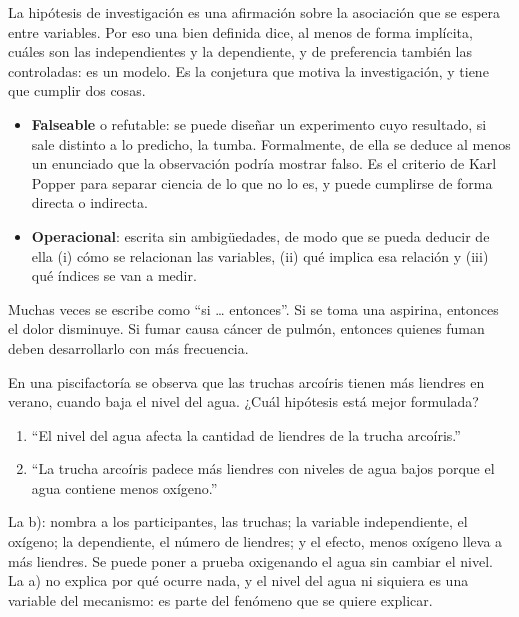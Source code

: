 \documentclass[11pt,letterpaper]{article}
\begin{document}
La hipótesis de investigación es una afirmación sobre la asociación
que se espera entre variables. Por eso una bien definida dice, al menos
de forma implícita, cuáles son las independientes y la dependiente, y
de preferencia también las controladas: es un modelo. Es la conjetura
que motiva la investigación, y tiene que cumplir dos cosas.

\begin{itemize}[itemsep=0.3em]
    \item \textbf{Falseable} o refutable: se puede diseñar un
          experimento cuyo resultado, si sale distinto a lo predicho,
          la tumba. Formalmente, de ella se deduce al menos un
          enunciado que la observación podría mostrar falso. Es el
          criterio de Karl Popper para separar ciencia de lo que no lo
          es, y puede cumplirse de forma directa o indirecta.
    \item \textbf{Operacional}: escrita sin ambigüedades, de modo que
          se pueda deducir de ella (i) cómo se relacionan las
          variables, (ii) qué implica esa relación y (iii) qué índices
          se van a medir.
\end{itemize}

Muchas veces se escribe como ``si \ldots{} entonces''. Si se toma una
aspirina, entonces el dolor disminuye. Si fumar causa cáncer de pulmón,
entonces quienes fuman deben desarrollarlo con más frecuencia.

\begin{ejemplo}
    En una piscifactoría se observa que las truchas arcoíris tienen más
    liendres en verano, cuando baja el nivel del agua. ¿Cuál hipótesis
    está mejor formulada?
    \begin{enumerate}[label=\alph*), itemsep=0.2em]
        \item ``El nivel del agua afecta la cantidad de liendres de la
              trucha arcoíris.''
        \item ``La trucha arcoíris padece más liendres con niveles de
              agua bajos porque el agua contiene menos oxígeno.''
    \end{enumerate}
    La b): nombra a los participantes, las truchas; la variable
    independiente, el oxígeno; la dependiente, el número de liendres; y
    el efecto, menos oxígeno lleva a más liendres. Se puede poner a
    prueba oxigenando el agua sin cambiar el nivel. La a) no explica
    por qué ocurre nada, y el nivel del agua ni siquiera es una
    variable del mecanismo: es parte del fenómeno que se quiere
    explicar.
\end{ejemplo}
\end{document}

